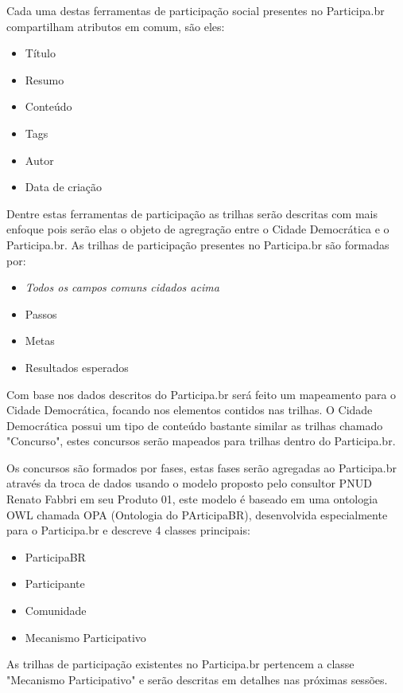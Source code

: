 \documentclass[12pt]{article}
\begin{document}
Cada uma destas ferramentas de participação social presentes no Participa.br
compartilham atributos em comum, são eles:

\begin{itemize}
  \item Título
  \item Resumo
  \item Conteúdo
  \item Tags
  \item Autor
  \item Data de criação
\end{itemize}

Dentre estas ferramentas de participação as trilhas serão descritas com mais
enfoque pois serão elas o objeto de agregração entre o Cidade Democrática e o
Participa.br. As trilhas de participação presentes no Participa.br são
formadas por:

\begin{itemize}
  \item {\it Todos os campos comuns cidados acima}
  \item Passos
  \item Metas
  \item Resultados esperados
\end{itemize}

Com base nos dados descritos do Participa.br será feito um mapeamento
para o Cidade Democrática, focando nos elementos contidos nas trilhas. O Cidade
Democrática possui um tipo de conteúdo bastante similar as trilhas chamado
"Concurso", estes concursos serão mapeados para trilhas dentro do
Participa.br.

Os concursos são formados por fases, estas fases serão agregadas ao
Participa.br através da troca de dados usando o modelo proposto pelo consultor
PNUD Renato Fabbri em seu Produto 01\cite{fabri}, este modelo é baseado em uma
ontologia OWL chamada OPA (Ontologia do PArticipaBR), desenvolvida
especialmente para o Participa.br e descreve 4 classes principais:

\begin{itemize}
  \item ParticipaBR
  \item Participante
  \item Comunidade
  \item Mecanismo Participativo
\end{itemize}

As trilhas de participação existentes no Participa.br pertencem a classe "Mecanismo
Participativo" e serão descritas em detalhes nas próximas sessões.
\end{document}

